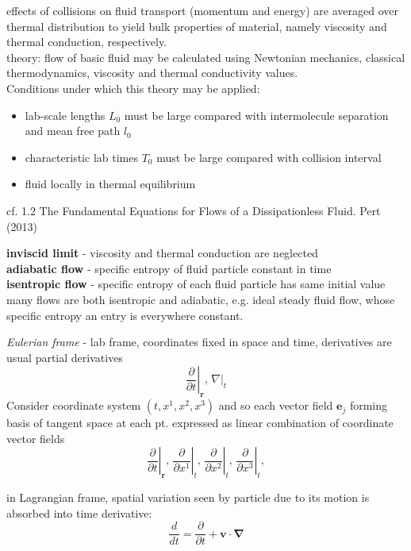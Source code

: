 \documentclass[10pt]{amsart}
\begin{document}
\begin{multicols*}{2}
effects of collisions on fluid transport (momentum and energy) are averaged over thermal distribution to yield bulk properties of material, namely viscosity and thermal conduction, respectively. \\

theory: flow of basic fluid may be calculated using Newtonian mechanics, classical thermodynamics, viscosity and thermal conductivity values. \\
Conditions under which this theory may be applied: \\
\begin{itemize}
	\item lab-scale lengths $L_0$ must be large compared with intermolecule separation and mean free path $l_0$ 
	\item characteristic lab times $T_0$ must be large compared with collision interval
	\item fluid locally in thermal equilibrium
\end{itemize}

cf. 1.2 The Fundamental Equations for Flows of a Dissipationless Fluid. Pert (2013) \cite{Pert2013}

\textbf{inviscid limit} - viscosity and thermal conduction are neglected \\
\textbf{adiabatic flow} - specific entropy of fluid particle constant in time \\
\textbf{isentropic flow} - specific entropy of each fluid particle has same initial value \\

many flows are both isentropic and adiabatic, e.g. ideal steady fluid flow, whose specific entropy an entry is everywhere constant.

\emph{Eulerian frame} - lab frame, coordinates fixed in space and time, derivatives are usual partial derivatives
\[
\left. \frac{ \partial }{ \partial t} \right|_{\mathbf{r}}, \, \left. \nabla \right|_t
\]
Consider coordinate system $(t, x^1, x^2, x^3)$ and so each vector field $\mathbf{e}_j$ forming basis of tangent space at each pt. expressed as linear combination of coordinate vector fields
\[
\left. \frac{\partial}{\partial t} \right|_{\mathbf{r}}, \, \left. \frac{\partial}{\partial x^1} \right|_{t}, \, \left. \frac{\partial}{\partial x^2} \right|_{t}, \, \left. \frac{\partial}{\partial x^3} \right|_{t},
\]

in Lagrangian frame, spatial variation seen by particle due to its motion is absorbed into time derivative:
\[
\frac{d}{dt} = \frac{\partial }{ \partial t} + \mathbf{v} \cdot \mathbf{\nabla} 
\]


\end{multicols*}
\end{document}
